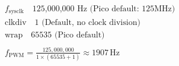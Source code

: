 \begin{align*}
& f_{\mathrm{sysclk}} \quad \text{125,000,000 Hz (Pico default: 125MHz)} \\
& \mathrm{clkdiv}  \quad \text{1 (Default, no clock division)} \\
& \mathrm{wrap}    \quad \text{65535 (Pico default)} \\
\\
& f_{\mathrm{PWM}}  = \frac{125,000,000}{1 \times (65535 + 1)} \approx 1907 \, \text{Hz}
\end{align*}